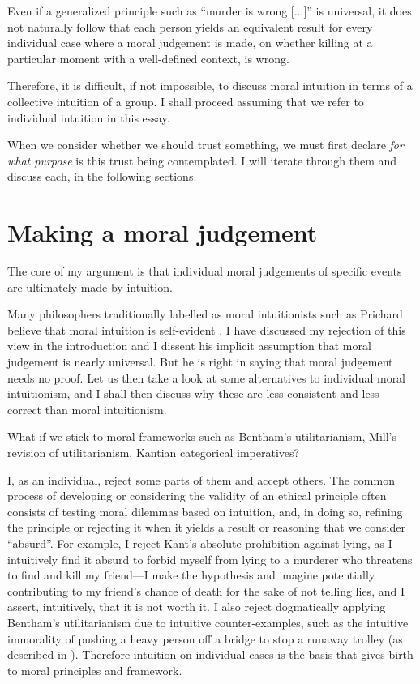 \documentclass{scrartcl}
\begin{document}
Even if a generalized principle such as ``murder is wrong [...]'' is universal, it does not naturally follow that each person yields an equivalent result for every individual case where a moral judgement is made, on whether killing at a particular moment with a well-defined context, is wrong.

Therefore, it is difficult, if not impossible, to discuss moral intuition in terms of a collective intuition of a group. I shall proceed assuming that we refer to individual intuition in this essay.

\bigskip

When we consider whether we should trust something, we must first declare \emph{for what purpose} is this trust being contemplated. I will iterate through them and discuss each, in the following sections.

\section{Making a moral judgement}

The core of my argument is that individual moral judgements of specific events are ultimately made by intuition.

Many philosophers traditionally labelled as moral intuitionists such as Prichard believe that moral intuition is self-evident \autocite{prichard}. I have discussed my rejection of this view in the introduction and I dissent his implicit assumption that moral judgement is nearly universal. But he is right in saying that moral judgement needs no proof. Let us then take a look at some alternatives to individual moral intuitionism, and I shall then discuss why these are less consistent and less correct than moral intuitionism.

What if we stick to moral frameworks such as Bentham's utilitarianism, Mill's revision of utilitarianism, Kantian categorical imperatives?

I, as an individual, reject some parts of them and accept others. The common process of developing or considering the validity of an ethical principle often consists of testing moral dilemmas based on intuition, and, in doing so, refining the principle or rejecting it when it yields a result or reasoning that we consider ``absurd''. For example, I reject Kant's absolute prohibition against lying, as I intuitively find it absurd to forbid myself from lying to a murderer who threatens to find and kill my friend---I make the hypothesis and imagine potentially contributing to my friend's chance of death for the sake of not telling lies, and I assert, intuitively, that it is not worth it. I also reject dogmatically applying Bentham's utilitarianism due to intuitive counter-examples, such as the intuitive immorality of pushing a heavy person off a bridge to stop a runaway trolley (as described in \autocite[21]{justice}). Therefore intuition on individual cases is the basis that gives birth to moral principles and framework.
\end{document}
